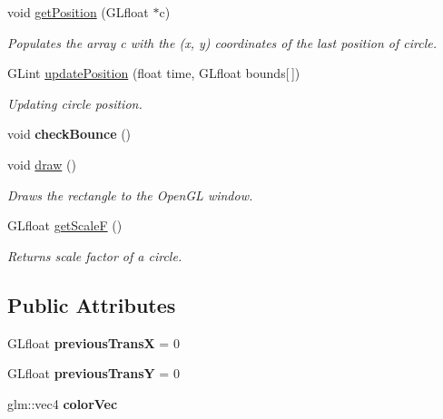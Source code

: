 \begin{DoxyCompactItemize}
void \hyperlink{class_circle_aebc11befca4806e04f9725c57a76a0cf}{get\+Position} (G\+Lfloat $\ast$c)
\begin{DoxyCompactList}\small\item\em Populates the array c with the (x, y) coordinates of the last position of circle. \end{DoxyCompactList}\item 
G\+Lint \hyperlink{class_circle_a7f9f6e7dee819efdd05080d1328b15e5}{update\+Position} (float time, G\+Lfloat bounds\mbox{[}$\,$\mbox{]})
\begin{DoxyCompactList}\small\item\em Updating circle position. \end{DoxyCompactList}\item 
\mbox{\label{class_circle_a3372f116baa8ab09197214594dab0aea}} 
void {\bfseries check\+Bounce} ()
\item 
\mbox{\label{class_circle_a3a3f7166e7f629e44f9044b0e537eb22}} 
void \hyperlink{class_circle_a3a3f7166e7f629e44f9044b0e537eb22}{draw} ()
\begin{DoxyCompactList}\small\item\em Draws the rectangle to the Open\+GL window. \end{DoxyCompactList}\item 
\mbox{\label{class_circle_a12598f697241259de764ddb342b9932a}} 
G\+Lfloat \hyperlink{class_circle_a12598f697241259de764ddb342b9932a}{get\+ScaleF} ()
\begin{DoxyCompactList}\small\item\em Returns scale factor of a circle. \end{DoxyCompactList}\end{DoxyCompactItemize}
\subsection*{Public Attributes}
\begin{DoxyCompactItemize}
\item 
\mbox{\label{class_circle_a06bdeac23b4fb3a92cb63fcf91866aef}} 
G\+Lfloat {\bfseries previous\+TransX} = 0
\item 
\mbox{\label{class_circle_a3672aa432dddeffcc39335ad71887692}} 
G\+Lfloat {\bfseries previous\+TransY} = 0
\item 
\mbox{\label{class_circle_a3d858c2ca9d07e845534918cf2a6d09b}} 
glm\+::vec4 {\bfseries color\+Vec}
\end{DoxyCompactItemize}


